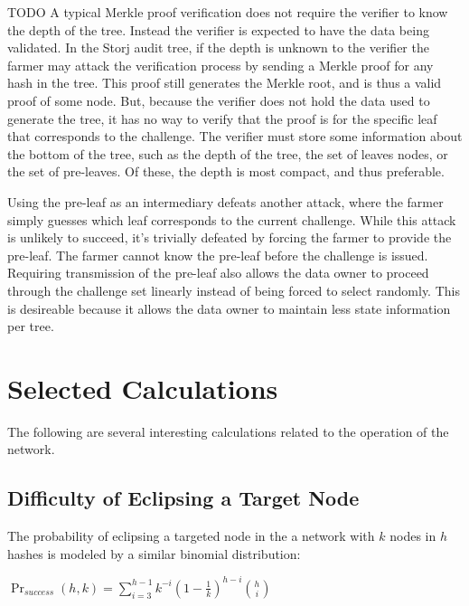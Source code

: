 \documentclass[a4paper,10pt]{article} \usepackage[utf8]{inputenc}
\newcommand{\todo}[1]{{\color{red} TODO #1 }}
\begin{document}
\todo{ A typical Merkle proof verification does not require the verifier to know
the depth of the tree. Instead the verifier is expected to have the data being
validated. In the Storj audit tree, if the depth is unknown to the verifier the
farmer may attack the verification process by sending a Merkle proof for any
hash in the tree. This proof still generates the Merkle root, and is thus a
valid proof of some node. But, because the verifier does not hold the data used
to generate the tree, it has no way to verify that the proof is for the specific
leaf that corresponds to the challenge. The verifier must store some information
about the bottom of the tree, such as the depth of the tree, the set of leaves
nodes, or the set of pre-leaves. Of these, the depth is most compact, and thus
preferable.

Using the pre-leaf as an intermediary defeats another attack, where the farmer
simply guesses which leaf corresponds to the current challenge. While this
attack is unlikely to succeed, it's trivially defeated by forcing the farmer to
provide the pre-leaf. The farmer cannot know the pre-leaf before the challenge
is issued. Requiring transmission of the pre-leaf also allows the data owner to
proceed through the challenge set linearly instead of being forced to select
randomly. This is desireable because it allows the data owner to maintain less
state information per tree. }

\section{Selected Calculations}

The following are several interesting calculations related to the operation of
the network.

\subsection{Difficulty of Eclipsing a Target Node}

The probability of eclipsing a targeted node in the a network with $ k $ nodes
in $ h $ hashes is modeled by a similar binomial distribution:

{\centering $\Pr_{success}(h, k) = \displaystyle \sum_{i=3}^{h-1}
k^{-i}(1-\frac{1}{k})^{h-i}{h \choose i}$ \\}
\end{document}
